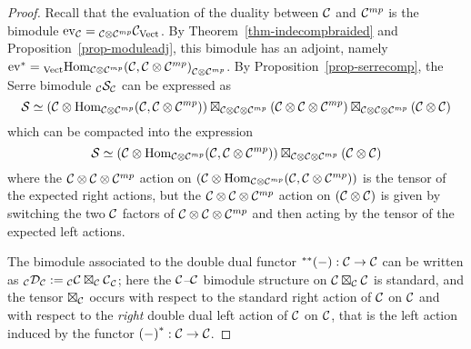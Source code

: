 \documentclass{amsart}
\begin{document}
\begin{proof}


Recall that the evaluation of the duality between $\mathcal C$ and $\mathcal C^{{mp}}$ is the bimodule $\mathrm{ev}_{\mathcal C} = {}_{\mathcal C \otimes \mathcal C^{{mp}}} {\mathcal C}_{\mathrm{Vect}}$.  By Theorem~\ref{thm-indecompbraided} and Proposition~\ref{prop-moduleadj}, this bimodule has an adjoint, namely ${\mathrm{ev}}^* = {}_{\mathrm{Vect}} {\operatorname{Hom}_{\mathcal C \otimes \mathcal C^{{mp}}}(\mathcal C,\mathcal C \otimes \mathcal C^{{mp}})}_{\mathcal C \otimes \mathcal C^{{mp}}}$.  By Proposition~\ref{prop-serrecomp}, the Serre bimodule ${}_{\mathcal C} {\mathcal S}_{\mathcal C}$ can be expressed as
\begin{equation} \nonumber
\mathcal S \simeq (\mathcal C \otimes \operatorname{Hom}_{\mathcal C \otimes \mathcal C^{{mp}}}(\mathcal C,\mathcal C \otimes \mathcal C^{{mp}})) \boxtimes_{\mathcal C \otimes \mathcal C \otimes \mathcal C^{{mp}}} (\mathcal C \otimes \mathcal C \otimes \mathcal C^{{mp}}) \boxtimes_{\mathcal C \otimes \mathcal C \otimes \mathcal C^{{mp}}} (\mathcal C \otimes \mathcal C)
\end{equation}
which can be compacted into the expression
\begin{equation} \nonumber
\mathcal S \simeq (\mathcal C \otimes \operatorname{Hom}_{\mathcal C \otimes \mathcal C^{{mp}}}(\mathcal C,\mathcal C \otimes \mathcal C^{{mp}})) \boxtimes_{\mathcal C \otimes \mathcal C \otimes \mathcal C^{{mp}}} (\mathcal C \otimes \mathcal C)
\end{equation}
where the $\mathcal C \otimes \mathcal C \otimes \mathcal C^{{mp}}$ action on $(\mathcal C \otimes \operatorname{Hom}_{\mathcal C \otimes \mathcal C^{{mp}}}(\mathcal C,\mathcal C \otimes \mathcal C^{{mp}}))$ is the tensor of the expected right actions, but the $\mathcal C \otimes \mathcal C \otimes \mathcal C^{{mp}}$ action on $(\mathcal C \otimes \mathcal C)$ is given by switching the two $\mathcal C$ factors of $\mathcal C \otimes \mathcal C \otimes \mathcal C^{{mp}}$ and then acting by the tensor of the expected left actions.

The bimodule associated to the double dual functor ${}^{**}{(-)}: \mathcal C \rightarrow \mathcal C$ can be written as ${}_{\mathcal C} {\mathcal D}_{\mathcal C} := {}_{\mathcal C} {\mathcal C \boxtimes_{\mathcal C} \mathcal C}_{\mathcal C}$; here the $\mathcal C$--$\mathcal C$ bimodule structure on ${\mathcal C \boxtimes_{\mathcal C} \mathcal C}$ is standard, and the tensor $\boxtimes_{\mathcal C}$ occurs with respect to the standard right action of $\mathcal C$ on $\mathcal C$ and with respect to the \emph{right} double dual left action of $\mathcal C$ on $\mathcal C$, that is the left action induced by the functor ${(-)}^*: \mathcal C \rightarrow \mathcal C$.


\end{proof}
\end{document}
